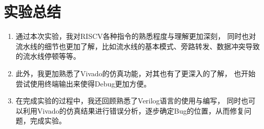 \documentclass[UTF8]{article}
\begin{document}
    \section{实验总结}
    \begin{enumerate}
        \item 通过本次实验，我对RISCV各种指令的熟悉程度与理解更加深刻，
        同时也对流水线的细节也更加了解，比如流水线的基本模式、旁路转发、数据冲突导致的流水线停顿等等。
        \item 此外，我更加熟悉了Vivado的仿真功能，对其也有了更深入的了解，
        也开始尝试使用终端输出来使得Debug更加方便。
        \item 在完成实验的过程中，我还回顾熟悉了Verilog语言的使用与编写，
        同时也可以利用Vivado的仿真结果进行错误分析，逐步确定Bug的位置，从而修复问题，完成实验。
    \end{enumerate}
\end{document}
